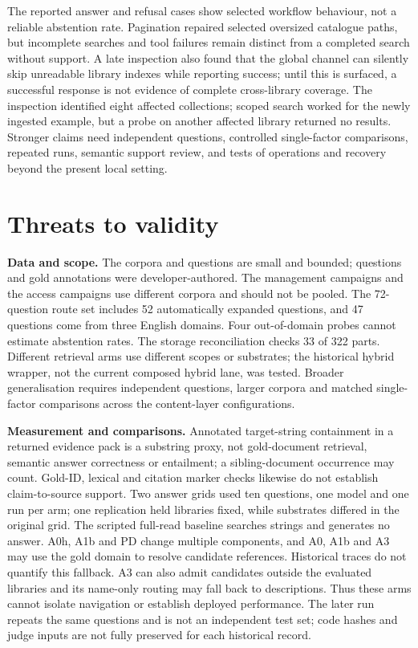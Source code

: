 \documentclass[11pt]{article}
\begin{document}
The reported answer and refusal cases show selected workflow behaviour, not a
reliable abstention rate. Pagination repaired selected oversized catalogue
paths, but incomplete searches and tool failures remain distinct from a
completed search without support. A late inspection also found that the global
channel can silently skip unreadable library indexes while reporting success;
until this is surfaced, a successful response is not evidence of complete
cross-library coverage. The inspection identified eight affected collections;
scoped search worked for the newly ingested example, but a probe on another
affected library returned no results. Stronger claims need
independent questions, controlled single-factor comparisons, repeated runs,
semantic support review, and tests of operations and recovery beyond the
present local setting.


\section{Threats to validity}


\noindent\textbf{Data and scope.} The corpora and questions are small and
bounded; questions and gold annotations were developer-authored. The
management campaigns and the access campaigns use different corpora and
should not be pooled. The 72-question route set includes 52 automatically
expanded questions, and 47 questions come from three English domains. Four
out-of-domain probes cannot estimate abstention rates. The storage
reconciliation checks 33 of 322 parts. Different retrieval arms use different
scopes or substrates; the historical hybrid wrapper, not the current composed
hybrid lane, was tested. Broader generalisation requires independent questions,
larger corpora and matched single-factor comparisons across the content-layer
configurations.

\noindent\textbf{Measurement and comparisons.} Annotated target-string
containment in a returned evidence pack is a substring proxy, not gold-document
retrieval, semantic answer correctness or entailment; a sibling-document
occurrence may count. Gold-ID, lexical and citation marker checks likewise do
not establish claim-to-source support. Two answer
grids used ten questions, one model and one run per arm; one replication held
libraries fixed, while substrates differed in the original grid. The scripted
full-read baseline searches strings and generates no answer. A0h, A1b and PD
change multiple components, and A0, A1b and A3 may use the gold domain to
resolve candidate references. Historical traces do not quantify this fallback.
A3 can also admit candidates outside the evaluated libraries and its
name-only routing may fall back to descriptions. Thus these arms cannot isolate
navigation or establish deployed performance. The later run repeats the same
questions and is not an independent test set; code hashes and judge inputs are
not fully preserved for each historical record.
\end{document}
